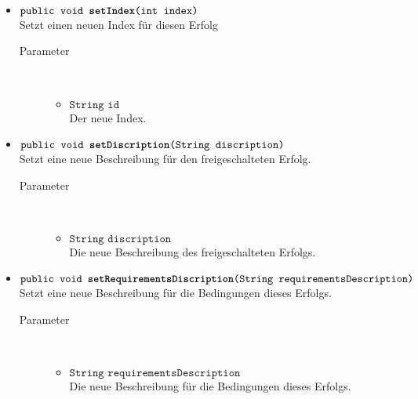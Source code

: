 \begin{description}
\begin{itemize}
	\item $\texttt{public void \textbf{setIndex}(int index)}$ \\ Setzt einen neuen Index für diesen Erfolg
		\begin{description}
			\item[Parameter] \hfill \\
			\vspace{-.8cm}
			\begin{itemize}
				\item $\texttt{String id}$ \\ Der neue Index.
			\end{itemize}
		\end{description}
		
		\item $\texttt{public void \textbf{setDiscription}(String discription)}$ \\ Setzt eine neue Beschreibung für den freigeschalteten Erfolg.
		\begin{description}
			\item[Parameter] \hfill \\
			\vspace{-.8cm}
			\begin{itemize}
				\item $\texttt{String discription}$ \\ Die neue Beschreibung des freigeschalteten Erfolgs.
			\end{itemize}
		\end{description}
		
		\item $\texttt{public void \textbf{setRequirementsDiscription}(String requirementsDescription)}$ \\ Setzt eine neue Beschreibung für die Bedingungen dieses Erfolgs.
		\begin{description}
			\item[Parameter] \hfill \\
			\vspace{-.8cm}
			\begin{itemize}
				\item $\texttt{String requirementsDescription}$ \\ Die neue Beschreibung für die Bedingungen dieses Erfolgs.
			\end{itemize}
		\end{description}
		

\end{itemize}
\end{description}
